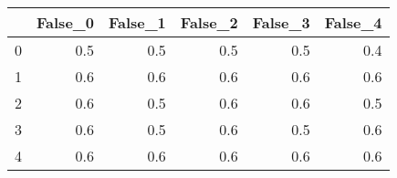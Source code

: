 \begin{tabular}{lrrrrr}
\toprule
{} &  False\_0 &  False\_1 &  False\_2 &  False\_3 &  False\_4 \\ \hline
\midrule
0 &      0.5 &      0.5 &      0.5 &      0.5 &      0.4 \\ \hline
1 &      0.6 &      0.6 &      0.6 &      0.6 &      0.6 \\ \hline
2 &      0.6 &      0.5 &      0.6 &      0.6 &      0.5 \\ \hline
3 &      0.6 &      0.5 &      0.6 &      0.5 &      0.6 \\ \hline
4 &      0.6 &      0.6 &      0.6 &      0.6 &      0.6 \\ \hline
\bottomrule
\end{tabular}
